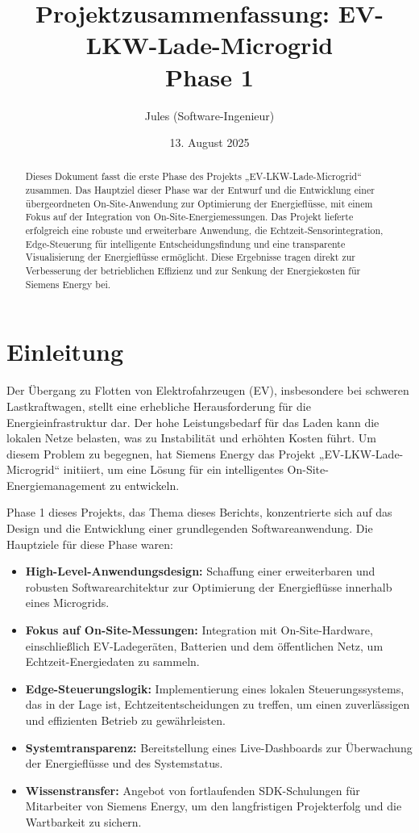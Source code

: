 \documentclass{article}
\title{Projektzusammenfassung: EV-LKW-Lade-Microgrid \\ Phase 1}
\author{Jules (Software-Ingenieur)}
\date{13. August 2025}
\begin{document}
\maketitle

\begin{abstract}
Dieses Dokument fasst die erste Phase des Projekts „EV-LKW-Lade-Microgrid“ zusammen. Das Hauptziel dieser Phase war der Entwurf und die Entwicklung einer übergeordneten On-Site-Anwendung zur Optimierung der Energieflüsse, mit einem Fokus auf der Integration von On-Site-Energiemessungen. Das Projekt lieferte erfolgreich eine robuste und erweiterbare Anwendung, die Echtzeit-Sensorintegration, Edge-Steuerung für intelligente Entscheidungsfindung und eine transparente Visualisierung der Energieflüsse ermöglicht. Diese Ergebnisse tragen direkt zur Verbesserung der betrieblichen Effizienz und zur Senkung der Energiekosten für Siemens Energy bei.
\end{abstract}

\tableofcontents
\newpage

\section{Einleitung}
Der Übergang zu Flotten von Elektrofahrzeugen (EV), insbesondere bei schweren Lastkraftwagen, stellt eine erhebliche Herausforderung für die Energieinfrastruktur dar. Der hohe Leistungsbedarf für das Laden kann die lokalen Netze belasten, was zu Instabilität und erhöhten Kosten führt. Um diesem Problem zu begegnen, hat Siemens Energy das Projekt „EV-LKW-Lade-Microgrid“ initiiert, um eine Lösung für ein intelligentes On-Site-Energiemanagement zu entwickeln.

Phase 1 dieses Projekts, das Thema dieses Berichts, konzentrierte sich auf das Design und die Entwicklung einer grundlegenden Softwareanwendung. Die Hauptziele für diese Phase waren:
\begin{itemize}
    \item \textbf{High-Level-Anwendungsdesign:} Schaffung einer erweiterbaren und robusten Softwarearchitektur zur Optimierung der Energieflüsse innerhalb eines Microgrids.
    \item \textbf{Fokus auf On-Site-Messungen:} Integration mit On-Site-Hardware, einschließlich EV-Ladegeräten, Batterien und dem öffentlichen Netz, um Echtzeit-Energiedaten zu sammeln.
    \item \textbf{Edge-Steuerungslogik:} Implementierung eines lokalen Steuerungssystems, das in der Lage ist, Echtzeitentscheidungen zu treffen, um einen zuverlässigen und effizienten Betrieb zu gewährleisten.
    \item \textbf{Systemtransparenz:} Bereitstellung eines Live-Dashboards zur Überwachung der Energieflüsse und des Systemstatus.
    \item \textbf{Wissenstransfer:} Angebot von fortlaufenden SDK-Schulungen für Mitarbeiter von Siemens Energy, um den langfristigen Projekterfolg und die Wartbarkeit zu sichern.
\end{itemize}
\end{document}
